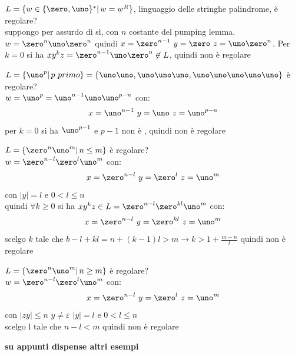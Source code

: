 \begin{example}
	$L=\{w\in\{\zero,\uno\}^*|\, w=w^R\}$, linguaggio delle stringhe palindrome, è regolare?\\
	suppongo per assurdo di sì, con $n$ costante del pumping lemma.\\
	$w=\zero^n\uno\zero^n$ quindi $x=\zero^{n-1}\,\,y=\zero\,\,z=\uno\zero^n$.
	Per $k=0$ si ha $xy^kz=\zero^{n-1}\uno\zero^n\not\in L$, quindi non è regolare
\end{example}
\begin{example}
	$L=\{\uno^p|\, p\,\,primo\}=\{\uno\uno,\uno\uno\uno,\uno\uno\uno\uno\uno\}$ è regolare?\\
	$w=\uno^p=\uno^{n-1}\uno\uno^{p-n}$ con:
	$$x=\uno^{n-1}\,\,y=\uno\,\,z=\uno^{p-n}$$
	per $k=0$ si ha $\uno^{p-1}$ e $p-1$ non è , quindi non è regolare
\end{example}
\begin{example}
	$L=\{\zero^n\uno^m|\, n\leq m\}$ è regolare?\\
	$w=\zero^{n-l}\zero^l\uno^{m}$ con:
	$$x=\zero^{n-l}\,\,y=\zero^l\,\,z=\uno^{m}$$
	con $|y|=l$ e $0<l\leq n$\\
	quindi $\forall k\geq 0$ si ha $xy^kz\in L=\zero^{n-l}\zero^{kl}\uno^{m}$ con:
	$$x=\zero^{n-l}\,\,y=\zero^{kl}\,\,z=\uno^{m}$$
	scelgo $k$ tale che $b-l+kl=n+(k-1)l>m\to k> 1+\frac{m-n}{l}$ quindi non è regolare
\end{example}
\begin{example}
	$L=\{\zero^n\uno^m|\, n\geq m\}$ è regolare?\\
	$w=\zero^{n-l}\zero^l\uno^{m}$ con:
	$$x=\zero^{n-l}\,\,y=\zero^l\,\,z=\uno^{m}$$
	con $|zy|\leq n\,\,y\neq\varepsilon\,\,|y|=l$ e $0<l\leq n$\\
	scelgo l tale che $n-l<m$ quindi non è regolare
\end{example}
\textbf{su appunti dispense altri esempi}

